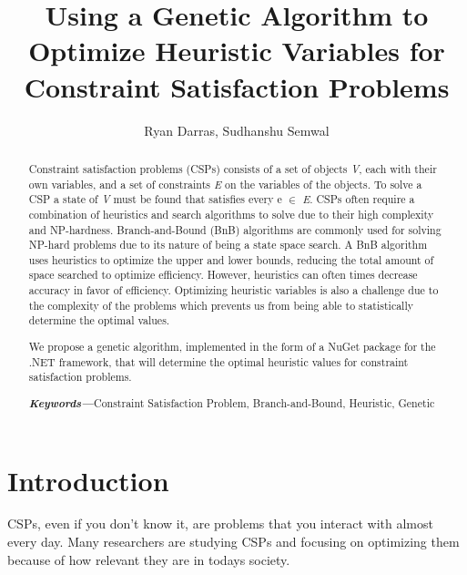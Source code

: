 \documentclass[10pt,twoside]{IEEEtran}
\title{Using a Genetic Algorithm to Optimize Heuristic Variables for Constraint Satisfaction Problems}
\author{Ryan Darras, Sudhanshu Semwal}
\providecommand{\keywords}[1]{\textbf{\textit{Keywords---}}#1}
\begin{document}
\maketitle

\begin{abstract}
Constraint satisfaction problems (CSPs) consists of a set of objects \emph{V}, each with their own variables, and a set of constraints \emph{E} on the variables of the objects. To solve a CSP a state of \emph{V} must be found that satisfies every e ${\in }$ \emph{E}. CSPs often require a combination of heuristics and search algorithms to solve due to their high complexity and NP-hardness. Branch-and-Bound (BnB) algorithms are commonly used for solving NP-hard problems due to its nature of being a state space search. A BnB algorithm uses heuristics to optimize the upper and lower bounds, reducing the total amount of space searched to optimize efficiency. However, heuristics can often times decrease accuracy in favor of efficiency. Optimizing heuristic variables is also a challenge due to the complexity of the problems which prevents us from being able to statistically determine the optimal values.

We propose a genetic algorithm, implemented in the form of a NuGet package for the .NET framework, that will determine the optimal heuristic values for constraint satisfaction problems. 

\vspace{5mm}
\noindent \keywords{Constraint Satisfaction Problem, Branch-and-Bound, Heuristic, Genetic}
\end{abstract}

\section{Introduction}
CSPs, even if you don't know it, are problems that you interact with almost every day. Many researchers are studying CSPs and focusing on optimizing them because of how relevant they are in todays society. 
\end{document}
